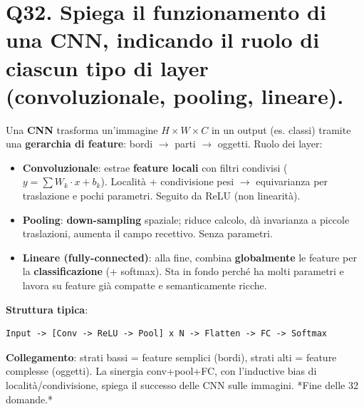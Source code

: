 \documentclass[11pt,a4paper]{article}
\begin{document}
\section*{Q32. Spiega il funzionamento di una CNN, indicando il ruolo di ciascun tipo di layer (convoluzionale, pooling, lineare).}
Una \textbf{CNN} trasforma un'immagine $H\times W\times C$ in un output (es. classi) tramite una \textbf{gerarchia di feature}: bordi $\to $ parti $\to $ oggetti. Ruolo dei layer:
\begin{itemize}
\item \textbf{Convoluzionale}: estrae \textbf{feature locali} con filtri condivisi ($y = \sum W_k\cdot x + b_k$). Località + condivisione pesi $\to $ equivarianza per traslazione e pochi parametri. Seguito da ReLU (non linearità).
\item \textbf{Pooling}: \textbf{down-sampling} spaziale; riduce calcolo, dà invarianza a piccole traslazioni, aumenta il campo recettivo. Senza parametri.
\item \textbf{Lineare (fully-connected)}: alla fine, combina \textbf{globalmente} le feature per la \textbf{classificazione} (+ softmax). Sta in fondo perché ha molti parametri e lavora su feature già compatte e semanticamente ricche.
\end{itemize}
\textbf{Struttura tipica}:
\begin{verbatim}
Input -> [Conv -> ReLU -> Pool] x N -> Flatten -> FC -> Softmax
\end{verbatim}
\textbf{Collegamento}: strati bassi = feature semplici (bordi), strati alti = feature complesse (oggetti). La sinergia conv+pool+FC, con l'inductive bias di località/condivisione, spiega il successo delle CNN sulle immagini.
*Fine delle 32 domande.*
\end{document}
